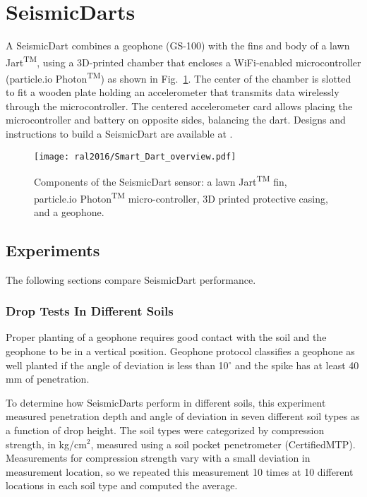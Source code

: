 \section[SeismicDarts]{SeismicDarts}

A SeismicDart combines a geophone (GS-100) with the fins and body of a lawn Jart\textsuperscript{TM}, using a 3D-printed chamber that encloses a WiFi-enabled microcontroller (particle.io Photon\textsuperscript{TM}) as shown in Fig.~\ref{fig:Smart_Dart_overview}.
The center of the chamber is slotted to fit a wooden plate holding an accelerometer that transmits data wirelessly through the microcontroller.
The centered accelerometer card allows placing the microcontroller and battery on opposite sides, balancing the dart.
Designs and instructions to build a SeismicDart are available at \cite{Victor2016Thingiverse}.

\begin{figure} \centering
	{\texttt{[image: ral2016/Smart\_Dart\_overview.pdf]}}
	\caption{
		Components of the SeismicDart sensor: a lawn  Jart\textsuperscript{TM} fin, particle.io Photon\textsuperscript{TM}  micro-controller, 3D printed protective casing, and a geophone.} 
	\label{fig:Smart_Dart_overview}
\end{figure}

\subsection{Experiments}
The following sections compare SeismicDart performance.
\subsubsection{ Drop Tests In Different Soils}
Proper planting of a geophone requires good contact with the soil and the geophone to be in a vertical position.
Geophone protocol classifies a geophone as well planted if the angle of deviation is less than 10$^\circ$ and the spike has at least 40 mm of penetration.

To determine how SeismicDarts perform in different soils, this experiment measured penetration depth and angle of deviation in seven different soil types as a function of drop height.
The soil types were categorized by compression strength, in kg/cm$^2$, measured using a soil pocket penetrometer (CertifiedMTP).
Measurements for compression strength vary with a small deviation in measurement location, so we repeated this measurement 10 times at 10 different locations in each soil type and computed the average.
 
